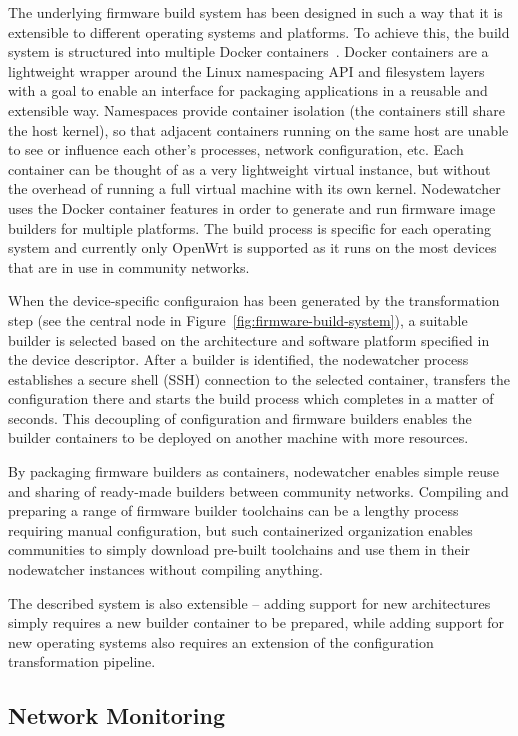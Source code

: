 \documentclass[5p,sort&compress]{elsarticle}
\begin{document}
The underlying firmware build system has been designed in such a way that it is extensible to different operating systems and platforms.
To achieve this, the build system is structured into multiple Docker containers~\cite{Docker_2013}.
Docker containers are a lightweight wrapper around the Linux namespacing API and filesystem layers with a goal to enable an interface for packaging applications in a reusable and extensible way.
Namespaces provide container isolation (the containers still share the host kernel), so that adjacent containers running on the same host are unable to see or influence each other's processes, network configuration, etc.
Each container can be thought of as a very lightweight virtual instance, but without the overhead of running a full virtual machine with its own kernel.
Nodewatcher uses the Docker container features in order to generate and run firmware image builders for multiple platforms.
The build process is specific for each operating system and currently only OpenWrt is supported as it runs on the most devices that are in use in community networks.

When the device-specific configuraion has been generated by the transformation step (see the central node in Figure~\ref{fig:firmware-build-system}), a suitable builder is selected based on the architecture and software platform specified in the device descriptor.
After a builder is identified, the nodewatcher process establishes a secure shell (SSH) connection to the selected container, transfers the configuration there and starts the build process which completes in a matter of seconds.
This decoupling of configuration and firmware builders enables the builder containers to be deployed on another machine with more resources.

By packaging firmware builders as containers, nodewatcher enables simple reuse and sharing of ready-made builders between community networks.
Compiling and preparing a range of firmware builder toolchains can be a lengthy process requiring manual configuration, but such containerized organization enables communities to simply download pre-built toolchains and use them in their nodewatcher instances without compiling anything.

The described system is also extensible -- adding support for new architectures simply requires a new builder container to be prepared, while adding support for new operating systems also requires an extension of the configuration transformation pipeline.

\subsection{Network Monitoring}
\end{document}
